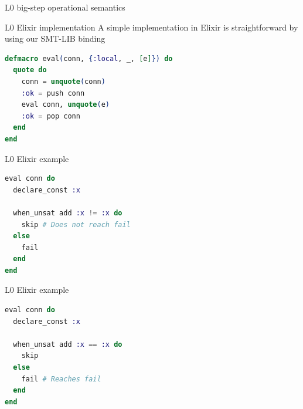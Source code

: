\documentclass{beamer}
\begin{document}
  \begin{frame}{L0 big-step operational semantics}
    \begin{prooftree}
    \end{prooftree}

    \pause \medskip

    \begin{prooftree}
    \end{prooftree}
    
    \pause \medskip
    
    \begin{prooftree}
    \end{prooftree}
  \end{frame}
  \begin{frame}[fragile]{L0 Elixir implementation}
    A simple implementation in Elixir is straightforward by using our SMT-LIB binding
    \small
    \pause \bigskip

    \begin{lstlisting}[language=elixir,numbers=none,frame=none]
defmacro eval(conn, {:local, _, [e]}) do
  quote do
    conn = unquote(conn)
    :ok = push conn
    eval conn, unquote(e)
    :ok = pop conn
  end
end
    \end{lstlisting}
  \end{frame}
  \begin{frame}[fragile]{L0 Elixir example}
    \small
    \begin{lstlisting}[language=elixir,numbers=none,frame=none]
eval conn do
  declare_const :x

  when_unsat add :x != :x do
    skip # Does not reach fail
  else
    fail
  end
end
    \end{lstlisting}
  \end{frame}
  \begin{frame}[fragile]{L0 Elixir example}
    \small
    \begin{lstlisting}[language=elixir,numbers=none,frame=none]
eval conn do
  declare_const :x

  when_unsat add :x == :x do
    skip
  else
    fail # Reaches fail
  end
end
    \end{lstlisting}
  \end{frame}
\end{document}
